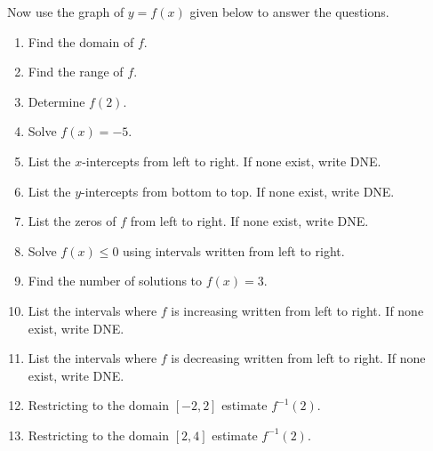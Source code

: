 \documentclass{ximera}
\author{Carl Stitz \and Jeff Zeager \and Bart Snapp \and Matthew Carr}
\begin{document}
\begin{exercise}




Now use the graph of $y = f(x)$ given below to answer the questions.
\begin{image}
\end{image}

\begin{enumerate}
\item  Find the domain of $f$. \label{usesecondfuncgraphfirst}
\item  Find the range of $f$.
\item  Determine $f(2)$.
\item  Solve $f(x) = -5$.
\item  List the $x$-intercepts from left to right. If none exist, write DNE.
\item  List the $y$-intercepts from bottom to top. If none exist, write DNE.
\item  List the zeros of $f$ from left to right. If none exist, write DNE.
\item  Solve $f(x) \leq 0$ using intervals written from left to right.
\item  Find the number of solutions to $f(x) = 3$.
\item  List the intervals where $f$ is increasing written from left to right. If none exist, write DNE.
\item  List the intervals where $f$ is decreasing written from left to right. If none exist, write DNE.
\item  Restricting to the domain $[-2,2]$ estimate $f^{-1}(2)$.
\item  Restricting to the domain $[2,4]$ estimate $f^{-1}(2)$.
\end{enumerate}


\end{exercise}
\end{document}
